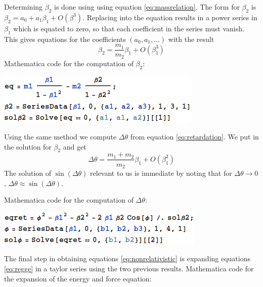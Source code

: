 \documentclass[11pt,a4paper]{article}
\begin{document}
Determining $\beta_2$ is done using using equation \ref{eq:massrelation}. The form for $\beta_2$ is $\beta_2=a_0+a_1\beta_1+O\left(\beta^3\right)$. Replacing into the equation results in a power series in $\beta_1$ which is equated to zero, so that each coefficient in the series must vanish. This gives equations for the coefficients $\left(a_0,a_1,...\right)$ with the result
\begin{equation*}
\beta_2=\frac{m_1}{m_2}\beta_1+O\left(\beta_1^3\right)
\end{equation*}
Mathematica code for the computation of $\beta_2$:

\includegraphics[scale=0.7]{figures/nonrelativisticb2.png}

Using the same method we compute $\Delta\theta$ from equation \ref{eq:retardation}. We put in the solution for $\beta_2$ and get
\begin{equation*}
\Delta\theta=\frac{m_1+m_2}{m_2}\beta_1+O\left(\beta_1^2\right)
\end{equation*}
The solution of $\sin\left(\Delta\theta\right)$ relevant to us is immediate by noting that for $\Delta\theta\rightarrow0$, $\Delta\theta\approx\sin\left(\Delta\theta\right)$.

Mathematica code for the computation of $\Delta\theta$:

\includegraphics[scale=0.7]{figures/nonrelativisticphi.png}

The final step in obtaining equations \ref{eq:nonrelativistic} is expanding equations \ref{eq:regge} in a taylor series using the two previous results. Mathematica code for the expansion of the energy and force equation:
\end{document}
